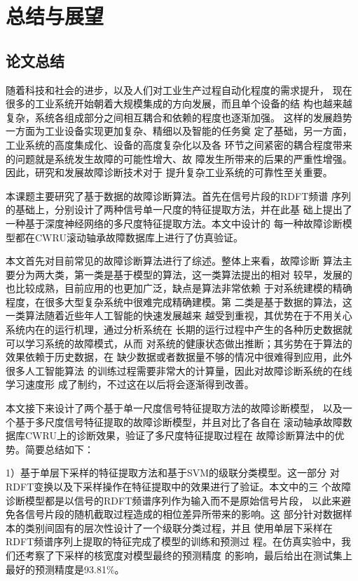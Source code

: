 \chapter{总结与展望}
\label{cha:summary}

\section{论文总结}

随着科技和社会的进步，以及人们对工业生产过程自动化程度的需求提升，
现在很多的工业系统开始朝着大规模集成的方向发展，而且单个设备的结
构也越来越复杂，系统各组成部分之间相互耦合和依赖的程度也逐渐加强。
这样的发展趋势一方面为工业设备实现更加复杂、精细以及智能的任务奠
定了基础，另一方面，工业系统的高度集成化、设备的高度复杂化以及各
环节之间紧密的耦合程度带来的问题就是系统发生故障的可能性增大、故
障发生所带来的后果的严重性增强。因此，研究和发展故障诊断技术对于
提升复杂工业系统的可靠性至关重要。

本课题主要研究了基于数据的故障诊断算法。首先在信号片段的RDFT频谱
序列的基础上，分别设计了两种信号单一尺度的特征提取方法，并在此基
础上提出了一种基于深度神经网络的多尺度特征提取方法。本文中设计的
每一种故障诊断模型都在CWRU滚动轴承故障数据库上进行了仿真验证。

本文首先对目前常见的故障诊断算法进行了综述。整体上来看，故障诊断
算法主要分为两大类，第一类是基于模型的算法，这一类算法提出的相对
较早，发展的也比较成熟，目前应用的也更加广泛，缺点是算法非常依赖
于对系统建模的精确程度，在很多大型复杂系统中很难完成精确建模。第
二类是基于数据的算法，这一类算法随着近些年人工智能的快速发展越来
越受到重视，其优势在于不用关心系统内在的运行机理，通过分析系统在
长期的运行过程中产生的各种历史数据就可以学习系统的故障模式，从而
对系统的健康状态做出推断；其劣势在于算法的效果依赖于历史数据，在
缺少数据或者数据量不够的情况中很难得到应用，此外很多人工智能算法
的训练过程需要非常大的计算量，因此对故障诊断系统的在线学习速度形
成了制约，不过这在以后将会逐渐得到改善。

本文接下来设计了两个基于单一尺度信号特征提取方法的故障诊断模型，
以及一个基于多尺度信号特征提取的故障诊断模型，并且对比了各自在
滚动轴承故障数据库CWRU上的诊断效果，验证了多尺度特征提取过程在
故障诊断算法中的优势。简要总结如下：

1）基于单层下采样的特征提取方法和基于SVM的级联分类模型。这一部分
对RDFT变换以及下采样操作在特征提取中的效果进行了验证。本文中的三
个故障诊断模型都是以信号的RDFT频谱序列作为输入而不是原始信号片段，
以此来避免各信号片段的随机截取过程造成的相位差异所带来的影响。这
部分针对数据样本的类别间固有的层次性设计了一个级联分类过程，并且
使用单层下采样在RDFT频谱序列上提取的特征完成了模型的训练和预测过
程。在仿真实验中，我们还考察了下采样的核宽度对模型最终的预测精度
的影响，最后给出在测试集上最好的预测精度是93.81\%。

